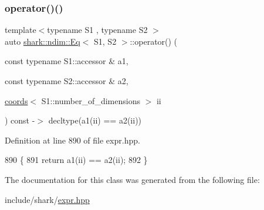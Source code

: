 \subsubsection{\texorpdfstring{operator()()}{operator()()}}
{\footnotesize\ttfamily template$<$typename S1 , typename S2 $>$ \\
auto \hyperlink{classshark_1_1ndim_1_1_eq}{shark\+::ndim\+::\+Eq}$<$ S1, S2 $>$\+::operator() (\begin{DoxyParamCaption}\item[{const typename S1\+::accessor \&}]{a1,  }\item[{const typename S2\+::accessor \&}]{a2,  }\item[{\hyperlink{structshark_1_1ndim_1_1coords}{coords}$<$ S1\+::number\+\_\+of\+\_\+dimensions $>$}]{ii }\end{DoxyParamCaption}) const -\/$>$ decltype(a1(ii) == a2(ii)) \hspace{0.3cm}{\ttfamily [inline]}}



Definition at line 890 of file expr.\+hpp.


\begin{DoxyCode}
890                                                                                                            
                                                            \{
891                 \textcolor{keywordflow}{return} a1(ii) == a2(ii);
892             \}
\end{DoxyCode}


The documentation for this class was generated from the following file\+:\begin{DoxyCompactItemize}
\item 
include/shark/\hyperlink{expr_8hpp}{expr.\+hpp}\end{DoxyCompactItemize}
